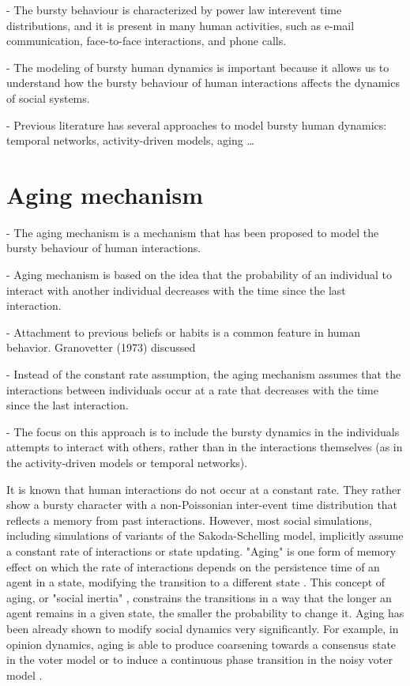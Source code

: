 - The bursty behaviour is characterized by power law interevent time distributions, and it is present in many human activities, such as e-mail communication, face-to-face interactions, and phone calls.

- The modeling of bursty human dynamics is important because it allows us to understand how the bursty behaviour of human interactions affects the dynamics of social systems.

- Previous literature has several approaches to model bursty human dynamics: temporal networks, activity-driven models, aging \dots

\section{\label{sec:Aging mechanism} Aging mechanism}

- The aging mechanism is a mechanism that has been proposed to model the bursty behaviour of human interactions.

- Aging mechanism is based on the idea that the probability of an individual to interact with another individual decreases with the time since the last interaction.

- Attachment to previous beliefs or habits is a common feature in human behavior. Granovetter (1973) discussed 

- Instead of the constant rate assumption, the aging mechanism assumes that the interactions between individuals occur at a rate that decreases with the time since the last interaction.

- The focus on this approach is to include the bursty dynamics in the individuals attempts to interact with others, rather than in the interactions themselves (as in the activity-driven models or temporal networks).

It is known that human interactions do not occur at a constant rate. They rather show  a bursty character with a non-Poissonian inter-event time distribution that reflects a memory from past interactions. \cite{barabasi-2005,moro,oriol,rybski-2012,zignani-2016,kumar-2020}
However, most social simulations, including simulations of variants of the Sakoda-Schelling model, implicitly assume a constant rate of interactions or state updating. "Aging" is one form of memory effect on which the rate of interactions depends on the persistence time of an agent in a state, modifying the transition to a different state \cite{fernandez-gracia-2011,perez-2016,boguna-2014}. This concept of aging, or "social inertia" \cite{Stark2008}, constrains the transitions in a way that the longer an agent remains in a given state, the smaller the probability to change it. Aging has been already shown to modify social dynamics very significantly. For example, in opinion dynamics, aging is able to produce coarsening towards a consensus state in the voter model \cite{fernandez-gracia-2011,peralta-2020} or to induce a continuous phase transition in the noisy voter model \cite{artime-2018}.

